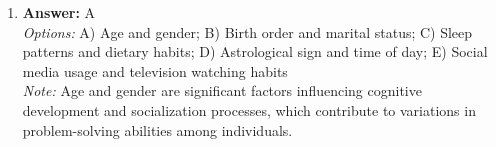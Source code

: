 \documentclass[12pt]{article}
\begin{document}
\begin{enumerate}[label=\arabic*.]
\\ \textit{Note:} The correct answer is accurate because systematic desensitization primarily involves gradual exposure to anxiety-provoking stimuli while teaching relaxation techniques, rather than utilizing hypnosis to achieve relaxation.
\item \textbf{Answer:} A
\\ \textit{Options:} A) Age and gender; B) Birth order and marital status; C) Sleep patterns and dietary habits; D) Astrological sign and time of day; E) Social media usage and television watching habits
\\ \textit{Note:} Age and gender are significant factors influencing cognitive development and socialization processes, which contribute to variations in problem-solving abilities among individuals.
\end{enumerate}
\end{document}
